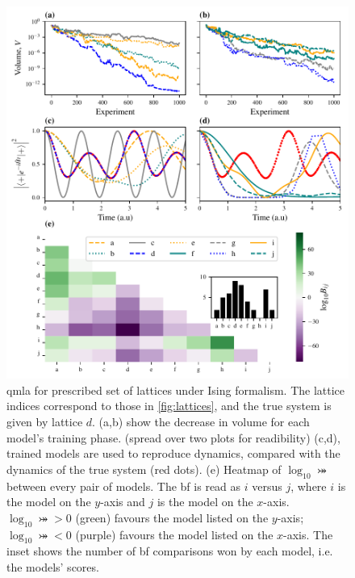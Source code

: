 \begin{figure}
    \begin{center}
        \includegraphics{theoretical_study/figures/lattice_qmla_summary.pdf}
    \end{center}
    \caption[QMLA for prescribed set of lattices under Ising formalism]{
        \gls{qmla} for prescribed set of lattices under Ising formalism. 
        The lattice indices correspond to those in \cref{fig:lattices}, 
            and the true system is given by lattice $d$. 
        (a,b) show the decrease in \gls{volume} for each model's training phase. (spread over two plots for readibility) 
        (c,d), trained models are used to reproduce dynamics, compared with the dynamics of the
            true system (red dots). 
        (e) Heatmap of $\log_{10} \bij$ between every pair of models. The \gls{bf} is read as 
        $i$ versus $j$, where $i$ is the model on the $y$-axis and $j$ is the model on the $x$-axis. 
        $\log_{10} \bij > 0$ (green) favours the model listed on the $y$-axis;
        $\log_{10} \bij < 0$ (purple) favours the model listed on the $x$-axis.
        The inset shows the number of \gls{bf} comparisons won by each model, i.e. the models' scores. 
        \figtableref
    }
    \label{fig:lattice_qmla_eg}
\end{figure}    

